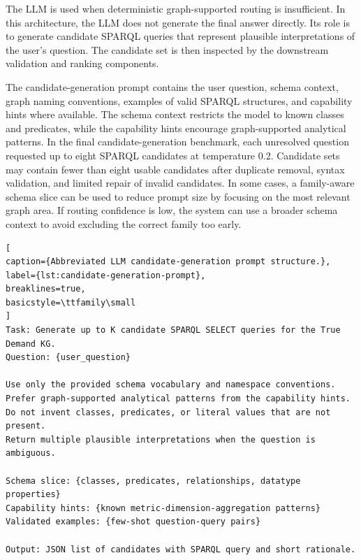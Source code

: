 \documentclass[
  12pt,
  english,
  oneside]{report}
\begin{document}
The LLM is used when deterministic graph-supported routing is insufficient. In this architecture, the LLM does not generate the final answer directly. Its role is to generate candidate SPARQL queries that represent plausible interpretations of the user's question. The candidate set is then inspected by the downstream validation and ranking components.

The candidate-generation prompt contains the user question, schema context, graph naming conventions, examples of valid SPARQL structures, and capability hints where available. The schema context restricts the model to known classes and predicates, while the capability hints encourage graph-supported analytical patterns. In the final candidate-generation benchmark, each unresolved question requested up to eight SPARQL candidates at temperature 0.2. Candidate sets may contain fewer than eight usable candidates after duplicate removal, syntax validation, and limited repair of invalid candidates. In some cases, a family-aware schema slice can be used to reduce prompt size by focusing on the most relevant graph area. If routing confidence is low, the system can use a broader schema context to avoid excluding the correct family too early.

\begin{lstlisting}[
caption={Abbreviated LLM candidate-generation prompt structure.},
label={lst:candidate-generation-prompt},
breaklines=true,
basicstyle=\ttfamily\small
]
Task: Generate up to K candidate SPARQL SELECT queries for the True Demand KG.
Question: {user_question}

Use only the provided schema vocabulary and namespace conventions.
Prefer graph-supported analytical patterns from the capability hints.
Do not invent classes, predicates, or literal values that are not present.
Return multiple plausible interpretations when the question is ambiguous.

Schema slice: {classes, predicates, relationships, datatype properties}
Capability hints: {known metric-dimension-aggregation patterns}
Validated examples: {few-shot question-query pairs}

Output: JSON list of candidates with SPARQL query and short rationale.
\end{lstlisting}
\end{document}
